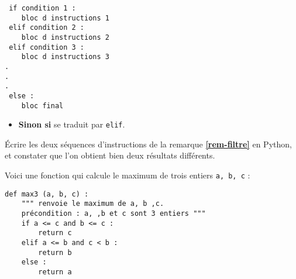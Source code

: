 %
%
%


\begin{lstlisting}
 if condition 1 :
	bloc d instructions 1
 elif condition 2 :
	bloc d instructions 2
 elif condition 3 :
	bloc d instructions 3
.
.
.
 else :
	bloc final
\end{lstlisting}

\begin{itemize}
 \item \textbf{Sinon si} se traduit par \texttt{elif}. 
\end{itemize}

\begin{exemple}
Écrire les deux séquences d'instructions de la remarque \textbf{\ref{rem-filtre}} en Python, et 
constater que l'on obtient bien deux résultats différents.
\end{exemple}

Voici une fonction qui calcule le maximum de trois entiers \texttt{a, b, c} :
\begin{lstlisting}
def max3 (a, b, c) :
    """ renvoie le maximum de a, b ,c.
    précondition : a, ,b et c sont 3 entiers """
    if a <= c and b <= c :
        return c
    elif a <= b and c < b :
        return b
    else :
        return a
\end{lstlisting}

